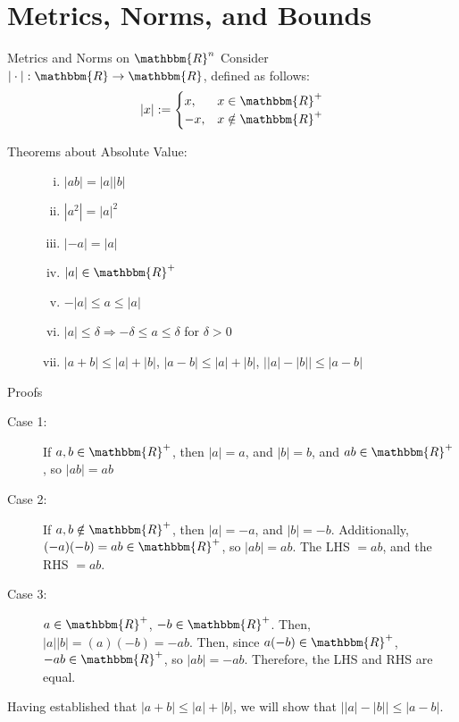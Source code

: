 \documentclass[10pt]{extarticle}
\newcommand{\R}{\mathbbm{R}}
\begin{document}
  \section{Metrics, Norms, and Bounds}%
  \begin{problem}{Metrics and Norms on $\R^n$}
    Consider $|\cdot|: \R \rightarrow \R$, defined as follows:
    \[
      |x| := \begin{cases}
        x,&x\in\R^+\\
        -x,&x\notin\R^+
      \end{cases}
    \] 
    \begin{description}
      \item[Theorems about Absolute Value:]\hfill
        \begin{enumerate}[(i)]
          \item $|ab| = |a||b|$
          \item $|a^2| = |a|^2$
          \item $|-a| = |a|$
          \item $|a|\in\R^+$
          \item $-|a| \leq a \leq |a|$
          \item $|a| \leq \delta \Rightarrow -\delta \leq a \leq \delta$ for $\delta > 0$
          \item $|a+b| \leq |a| + |b|$, $|a-b| \leq |a| + |b|$, $\vert|a| - |b|\vert \leq |a-b|$
        \end{enumerate}
    \end{description}
    \begin{problem}{Proofs}
      \begin{description}[font=\normalfont]
        \item[Proof of (i)]\hfill
          \begin{description}
            \item[Case 1:] If $a,b\in\R^+$, then $|a| = a$, and $|b| = b$, and $ab \in \R^+$, so $|ab| = ab$
            \item[Case 2:] If $a,b\notin\R^+$, then $|a| = -a$, and $|b| = -b$. Additionally, $(-a)(-b)=ab \in\R^+$, so $|ab| = ab$. The LHS $=ab$, and the RHS $=ab$.
            \item[Case 3:] $a\in\R^+$, $-b\in\R^+$. Then, $|a||b| = (a)(-b) = -ab$. Then, since $a(-b)\in\R^+$, $-ab\in\R^+$, so $|ab| = -ab$. Therefore, the LHS and RHS are equal.
          \end{description}
        \item[Proof of (vii)] Having established that $|a+b| \leq |a| + |b|$, we will show that $\vert|a| - |b|\vert \leq |a-b|$.

\end{description}
\end{problem}
\end{problem}
\end{document}
